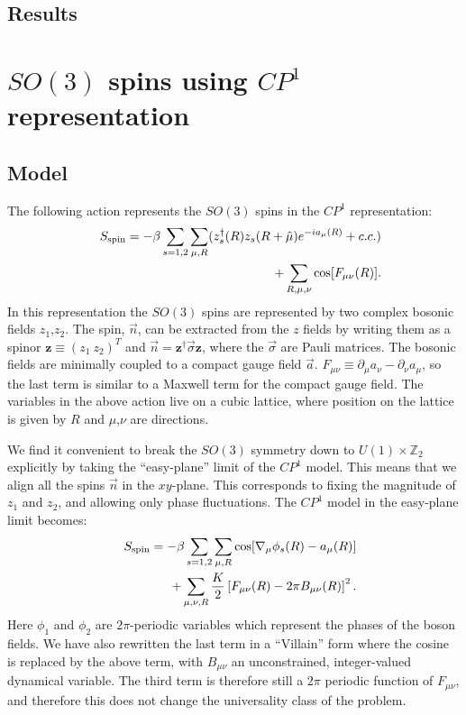 \documentclass[prb,twocolumn]{revtex4}
\begin{document}
\subsection{Results}

\section{$SO(3)$ spins using $CP^1$ representation}
\label{section::CP1}

\subsection{Model}
The following action represents the $SO(3)$ spins in the $CP^1$ representation:
\begin{eqnarray}
&&S_{\rm spin}=-\beta\sum_{s=1,2}\sum_{\mu,R} (z_s^\dagger(R)z_s(R+\hat\mu)e^{-ia_\mu(R)}+c.c.) \nonumber\\
&&+\sum_{R,\mu,\nu} \cos[F_{\mu\nu}(R)].
\end{eqnarray} 
In this representation the $SO(3)$ spins are represented by two complex bosonic fields $z_1$,$z_2$. The spin, $\vec{n}$, can be extracted from the $z$ fields by writing them as a spinor $\mathbf{z}\equiv(z_1~z_2)^T$ and $\vec{n}=\mathbf{z^\dagger} \vec\sigma \mathbf{z}$, where the $\vec{\sigma}$ are Pauli matrices. The bosonic fields are minimally coupled to a compact gauge field $\vec{a}$. $F_{\mu\nu}\equiv \partial_\mu a_\nu-\partial_\nu a_\mu$, so the last term is similar to a Maxwell term for the compact gauge field. The variables in the above action live on a cubic lattice, where position on the lattice is given by $R$ and $\mu$,$\nu$ are directions.

We find it convenient to break the $SO(3)$ symmetry down to $U(1)\times\mathbb{Z}_2$ explicitly by taking the ``easy-plane'' limit of the $CP^1$ model. This means that we align all the spins $\vec{n}$ in the $xy$-plane. This corresponds to fixing the magnitude of $z_1$ and $z_2$, and allowing only phase fluctuations. The $CP^1$ model in the easy-plane limit becomes:
\begin{eqnarray}
&&S_{\rm spin}=-\beta\sum_{s=1,2}\sum_{\mu,R} \cos[\nabla_\mu\phi_s(R)-a_\mu(R)]\nonumber\\
&&+\sum_{\mu,\nu,R}\frac{K}{2}\left[F_{\mu\nu}(R)-2\pi B_{\mu\nu}(R)\right]^2.
\label{sspin}
\end{eqnarray}
Here $\phi_1$ and $\phi_2$ are $2\pi$-periodic variables which represent the phases of the boson fields. We have also rewritten the last term in a ``Villain'' form where the cosine is replaced by the above term, with $B_{\mu\nu}$ an unconstrained, integer-valued dynamical variable. The third term is therefore still a $2\pi$ periodic function of $F_{\mu\nu}$, and therefore this does not change the universality class of the problem.
\end{document}
